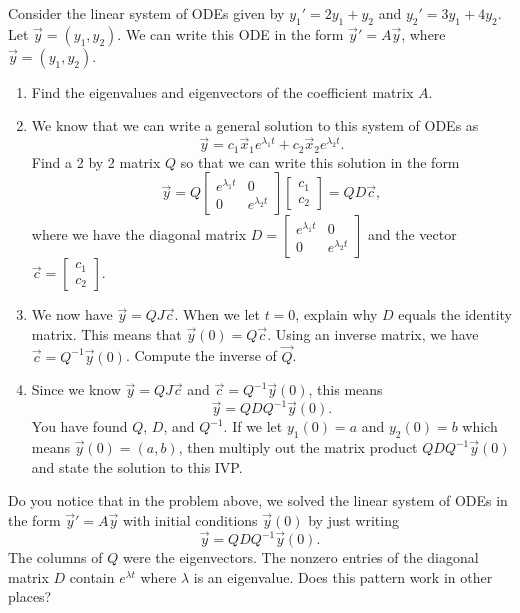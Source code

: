 \begin{problem}
 Consider the linear system of ODEs given by $y_1'=2y_1+y_2$ and $y_2'=3y_1+4y_2$. Let $\vec y = (y_1,y_2)$. We can write this ODE in the form $\vec y' = A\vec y$, where $\vec y = (y_1,y_2)$.  
 \begin{enumerate}
  \item Find the eigenvalues and eigenvectors of the coefficient matrix $A$.
  \item We know that we can write a general solution to this system of ODEs as 
$$
\vec y=
c_1\vec x_1 e^{\lambda_1 t }+c_2\vec x_2 e^{\lambda_2 t}.
$$
Find a 2 by 2 matrix $Q$ so that we can write this solution in the form 
$$
\vec y=
Q\begin{bmatrix}
 e^{\lambda_1 t} & 0\\
 0 & e^{\lambda_2 t}
\end{bmatrix}
\begin{bmatrix}
c_1\\c_2 
\end{bmatrix}
=QD\vec c,
$$
where we have the diagonal matrix $D=
\begin{bmatrix}
 e^{\lambda_1 t} & 0\\
 0 & e^{\lambda_2 t}
\end{bmatrix}$ 
and the vector 
$\vec c =
\begin{bmatrix}
c_1\\c_2 
\end{bmatrix}
$.
\item We now have $\vec y = QJ\vec c$. When we let $t=0$, explain why $D$ equals the identity matrix. This means that $\vec y(0) = Q\vec c$.  Using an inverse matrix, we have $\vec c= Q^{-1}\vec y(0)$.  Compute the inverse of $\vec Q$.
\item 
Since we know $\vec y = QJ\vec c$ and $\vec c= Q^{-1}\vec y(0)$, this means 
$$\vec y = QDQ^{-1}\vec y(0).$$
You have found $Q$, $D$, and $Q^{-1}$. If we let $y_1(0)=a$ and $y_2(0)=b$ which means $\vec y(0)=(a,b)$, then multiply out the matrix product $QDQ^{-1}\vec y(0)$ and state the solution to this IVP.
\end{enumerate}

\end{problem}

Do you notice that in the problem above, we solved the linear system of ODEs in the form $\vec y' = A\vec y$  with initial conditions $\vec y(0)$ by just writing
$$\vec y = QDQ^{-1}\vec y(0).$$
The columns of $Q$ were the eigenvectors.  The nonzero entries of the diagonal matrix $D$ contain $e^{\lambda t}$ where $\lambda$ is an eigenvalue.  Does this pattern work in other places?

